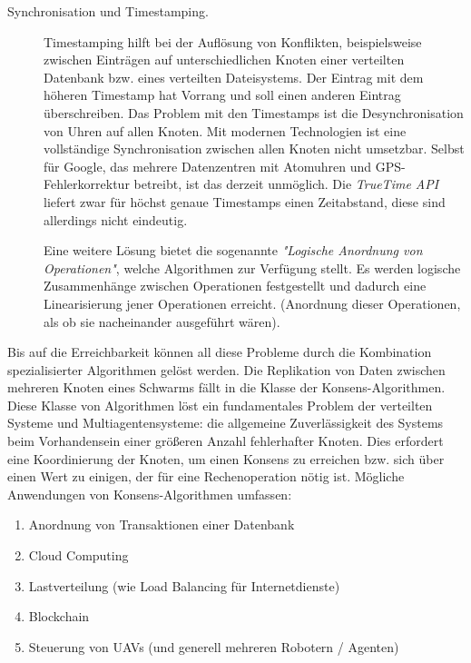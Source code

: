 \begin{description}
	\item[Synchronisation und Timestamping.] Timestamping hilft bei der Auflösung von Konflikten, beispielsweise zwischen Einträgen auf unterschiedlichen Knoten einer verteilten Datenbank bzw. eines verteilten Dateisystems. Der Eintrag mit dem höheren Timestamp hat Vorrang und soll einen anderen Eintrag überschreiben. Das Problem mit den Timestamps ist die Desynchronisation von Uhren auf allen Knoten. Mit modernen Technologien ist eine vollständige Synchronisation zwischen allen Knoten nicht umsetzbar. Selbst für Google, das mehrere Datenzentren mit Atomuhren und GPS-Fehlerkorrektur betreibt, ist das derzeit unmöglich. Die \textit{TrueTime API} liefert zwar für höchst genaue Timestamps einen Zeitabstand, diese sind allerdings nicht eindeutig.
	
	Eine weitere Lösung bietet die sogenannte \textit{"Logische Anordnung von Operationen"}, welche Algorithmen zur Verfügung stellt. Es werden logische Zusammenhänge zwischen Operationen festgestellt und dadurch eine Linearisierung jener Operationen erreicht. (Anordnung dieser Operationen, als ob sie nacheinander ausgeführt wären).
\end{description}

Bis auf die Erreichbarkeit können all diese Probleme durch die Kombination spezialisierter Algorithmen gelöst werden. Die Replikation von Daten zwischen mehreren Knoten eines Schwarms fällt in die Klasse der Konsens-Algorithmen. Diese Klasse von Algorithmen löst ein fundamentales Problem der verteilten Systeme und Multiagentensysteme: die allgemeine Zuverlässigkeit des Systems beim Vorhandensein einer größeren Anzahl fehlerhafter Knoten. Dies erfordert eine Koordinierung der Knoten, um einen Konsens zu erreichen bzw. sich über einen Wert zu einigen, der für eine Rechenoperation nötig ist. Mögliche Anwendungen von Konsens-Algorithmen umfassen:

\begin{enumerate}
	\item Anordnung von Transaktionen einer Datenbank
	
	\item Cloud Computing
	
	\item Lastverteilung (wie Load Balancing für Internetdienste)
	
	\item Blockchain
	
	\item Steuerung von UAVs (und generell mehreren Robotern / Agenten)
\end{enumerate}

